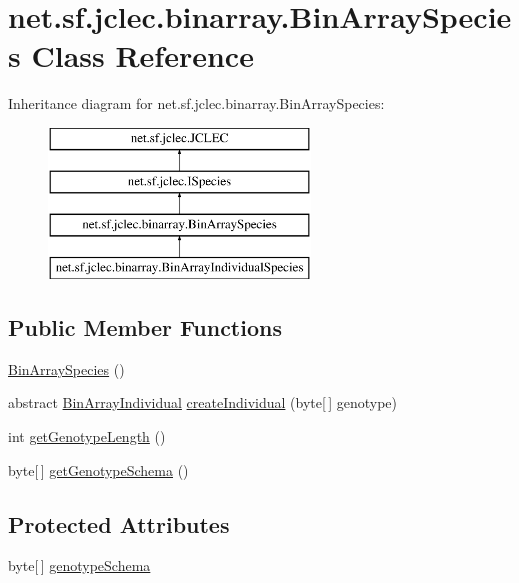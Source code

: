 \hypertarget{classnet_1_1sf_1_1jclec_1_1binarray_1_1_bin_array_species}{\section{net.\-sf.\-jclec.\-binarray.\-Bin\-Array\-Species Class Reference}
\label{classnet_1_1sf_1_1jclec_1_1binarray_1_1_bin_array_species}
}
Inheritance diagram for net.\-sf.\-jclec.\-binarray.\-Bin\-Array\-Species\-:\begin{figure}[H]
\begin{center}
\leavevmode
\includegraphics[height=4.000000cm]{classnet_1_1sf_1_1jclec_1_1binarray_1_1_bin_array_species}
\end{center}
\end{figure}
\subsection*{Public Member Functions}
\begin{DoxyCompactItemize}
\item 
\hyperlink{classnet_1_1sf_1_1jclec_1_1binarray_1_1_bin_array_species_ab19cefea88f3534de20bdfdf86fc7e49}{Bin\-Array\-Species} ()
\item 
abstract \hyperlink{classnet_1_1sf_1_1jclec_1_1binarray_1_1_bin_array_individual}{Bin\-Array\-Individual} \hyperlink{classnet_1_1sf_1_1jclec_1_1binarray_1_1_bin_array_species_a56e839a1fa64ffd8f6a595a63fa8ab28}{create\-Individual} (byte\mbox{[}$\,$\mbox{]} genotype)
\item 
int \hyperlink{classnet_1_1sf_1_1jclec_1_1binarray_1_1_bin_array_species_ab7d920897365990a3414db257bdaf743}{get\-Genotype\-Length} ()
\item 
byte\mbox{[}$\,$\mbox{]} \hyperlink{classnet_1_1sf_1_1jclec_1_1binarray_1_1_bin_array_species_a70e09b5cd11270151b6c9b6e02feedf9}{get\-Genotype\-Schema} ()
\end{DoxyCompactItemize}
\subsection*{Protected Attributes}
\begin{DoxyCompactItemize}
\item 
byte\mbox{[}$\,$\mbox{]} \hyperlink{classnet_1_1sf_1_1jclec_1_1binarray_1_1_bin_array_species_ab0e39779362683e78929877e42c7e660}{genotype\-Schema}
\end{DoxyCompactItemize}


